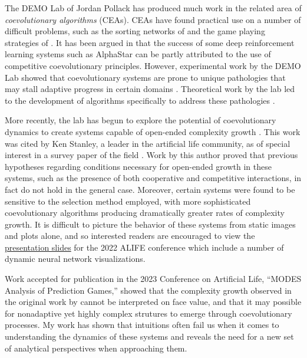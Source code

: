 \documentclass{article}
\begin{document}
The DEMO Lab of Jordan Pollack has produced much work in the related area of 
\textit{coevolutionary algorithms} (CEAs). CEAs have found practical use on a number of 
difficult problems, such as the sorting networks of \citet{hillis1990co} and the game playing strategies of 
\citet{rosin1995methods}. It has been argued in \citet{togelius2019} that the success 
of some deep reinforcement learning systems such as AlphaStar can be partly attributed to the use of 
competitive coevolutionary principles. However, experimental work by the DEMO Lab showed that 
coevolutionary systems are  prone to unique pathologies that may stall adaptive progress in
certain domains \citep{watson2001coevolutionary}. Theoretical 
work by the lab led to the development of algorithms specifically to address these pathologies
\citep{noble2001pareto, jong2004ideal,de2004incremental}. 

More recently, the lab has begun to explore the potential of coevolutionary dynamics to create
systems capable of open-ended complexity growth \citep{harrington2019escalation,moran2019evolving}. 
This work was cited by Ken Stanley, a leader in the artificial life community, as of special 
interest in a survey paper of the field \citep{stanley2019}. Work by this author \citep{willkens2022} proved that 
previous hypotheses regarding conditions necessary for open-ended growth in these systems,
such as the presence of both cooperative and competitive interactions, in fact do not hold
in the general case. Moreover, certain systems were found to be sensitive to the 
selection method employed, with more sophisticated coevolutionary algorithms producing dramatically
greater rates of complexity growth. It is difficult to picture the behavior of these systems 
from static images and plots alone, and so interested readers are encouraged to view the 
\href{https://docs.google.com/presentation/d/1tklPPoT9hPfJkl9Fy-eHtzVZWNgh4hqUpuVcSHMLBWs/edit?usp=sharing}{presentation slides}
for the 2022 ALIFE conference which include a number of dynamic neural network visualizations.

Work accepted for publication in the 2023 Conference on Artificial Life, ``MODES Analysis of Prediction Games,''
showed that the complexity growth observed in the original work by \citet{moran2019evolving}
cannot be interpreted on face value, and that it may possible
for nonadaptive yet highly complex strutures to emerge through coevolutionary processes. My
work has shown that intuitions often fail us when it comes to understanding the dynamics
of these systems and reveals the need for  a new set of analytical perspectives
when approaching them.
\end{document}
